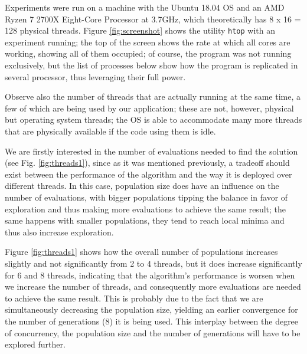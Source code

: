 \documentclass[runningheads]{llncs}\usepackage[]{graphicx}\usepackage[]{color}
\begin{document}
Experiments were run on a machine with the
Ubuntu 18.04 OS and an AMD Ryzen 7 2700X Eight-Core Processor
at 3.7GHz, which theoretically has 8 x 16 = 128 physical
threads. Figure \ref{fig:screenshot} shows the utility  {\tt htop} with an 
experiment running; the top of the screen shows the rate at which all
cores are working, showing all of them occupied; of course, the
program was not running exclusively, but the list of processes below
show how the program is replicated in several processor, thus
leveraging their full power. 

Observe also the number of threads
that are actually running at the same time, 
a few of which are being used by our application; these are not, however, 
physical but operating system threads; 
the OS is able to accommodate many more threads that are physically 
available if the code using them is idle. 

%
We are firstly interested in the number of evaluations needed to find
the solution (see Fig. \ref{fig:threads1}), since as
it was mentioned previously, a tradeoff should exist
between the performance of the algorithm and the way it is
deployed over different threads. In this case, population
size does have an influence on the number of evaluations, with bigger
populations tipping the balance in favor of exploration and thus
making more evaluations to achieve the same result; the same happens
with smaller populations, they tend to reach local minima and thus
also increase exploration. 

Figure \ref{fig:threads1} shows how the
overall number of populations
increases slightly and not significantly from 2 to 4 threads, but it
does increase significantly for 6 and 8 threads, indicating that the
algorithm's performance is worsen when we increase the number
of threads, and consequently more evaluations are needed to achieve the
same result. This is probably due to the fact that we are
simultaneously decreasing the population size, yielding an earlier
convergence for the number of generations (8) it is being used. This
interplay between the degree of concurrency, the population size and
the number of generations will have to be explored further.
\end{document}
